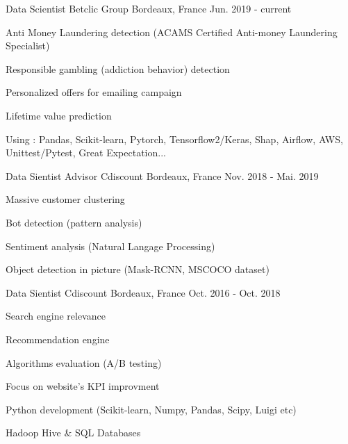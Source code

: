 

\begin{cventries}

  \cventry
    {Data Scientist} %
    {Betclic Group} %
    {Bordeaux, France} %
    {Jun. 2019 - current} %
    {
      \begin{cvitems} %
        \item {Anti Money Laundering detection (ACAMS Certified Anti-money Laundering Specialist)}
        \item {Responsible gambling (addiction behavior) detection}
        \item {Personalized offers for emailing campaign}
        \item {Lifetime value prediction}
      \end{cvitems}
    \vspace{9} 
    Using : Pandas, Scikit-learn, Pytorch, Tensorflow2/Keras, Shap, Airflow, AWS, Unittest/Pytest, Great Expectation...  
    }

  \cventry
    {Data Sientist Advisor} %
    {Cdiscount} %
    {Bordeaux, France} %
    {Nov. 2018 - Mai. 2019} %
    {
       \begin{cvitems} %
        \item {Massive customer clustering}
        \item {Bot detection (pattern analysis)}
        \item {Sentiment analysis (Natural Langage Processing)}
        \item {Object detection in picture (Mask-RCNN, MSCOCO dataset)}
      \end{cvitems}
    }

  \cventry
    {Data Sientist} %
    {Cdiscount} %
    {Bordeaux, France} %
    {Oct. 2016 - Oct. 2018} %
    {
      \begin{cvitems} %
        \item {Search engine relevance}
        \item {Recommendation engine}
        \item {Algorithms evaluation (A/B testing)}
        \item {Focus on website's KPI improvment}
        \item {Python development (Scikit-learn, Numpy, Pandas, Scipy, Luigi etc)}
        \item {Hadoop Hive \& SQL Databases}
      \end{cvitems}
    }


\end{cventries}

